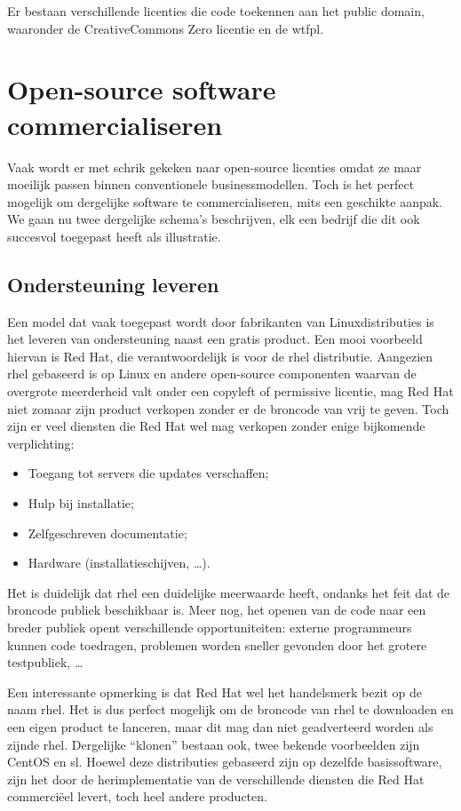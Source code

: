 Er bestaan verschillende licenties die code toekennen aan het public domain, waaronder de CreativeCommons Zero licentie en de \ac{wtfpl}.

\section{Open-source software commercialiseren}
\label{ontwerp:licenties:commercialiseren}

Vaak wordt er met schrik gekeken naar open-source licenties omdat ze maar moeilijk passen binnen conventionele businessmodellen. Toch is het perfect mogelijk om dergelijke software te commercialiseren, mits een geschikte aanpak. We gaan nu twee dergelijke schema's beschrijven, elk een bedrijf die dit ook succesvol toegepast heeft als illustratie.

\subsection{Ondersteuning leveren}
\label{ontwerp:licenties:commercialiseren:ondersteuning}

Een model dat vaak toegepast wordt door fabrikanten van Linuxdistributies is het leveren van ondersteuning naast een gratis product. Een mooi voorbeeld hiervan is Red Hat, die verantwoordelijk is voor de \ac{rhel} distributie. Aangezien \ac{rhel} gebaseerd is op Linux en andere open-source componenten waarvan de overgrote meerderheid valt onder een copyleft of permissive licentie, mag Red Hat niet zomaar zijn product verkopen zonder er de broncode van vrij te geven. Toch zijn er veel diensten die Red Hat wel mag verkopen zonder enige bijkomende verplichting:
\begin{itemize}
  \item Toegang tot servers die updates verschaffen;
  \item Hulp bij installatie;
  \item Zelfgeschreven documentatie;
  \item Hardware (installatieschijven, \ldots).
\end{itemize}

Het is duidelijk dat \ac{rhel} een duidelijke meerwaarde heeft, ondanks het feit dat de broncode publiek beschikbaar is. Meer nog, het openen van de code naar een breder publiek opent verschillende opportuniteiten: externe programmeurs kunnen code toedragen, problemen worden sneller gevonden door het grotere testpubliek, \ldots

Een interessante opmerking is dat Red Hat wel het handelsmerk bezit op de naam \acl{rhel}. Het is dus perfect mogelijk om de broncode van \ac{rhel} te downloaden en een eigen product te lanceren, maar dit mag dan niet geadverteerd worden als zijnde \ac{rhel}. Dergelijke ``klonen'' bestaan ook, twee bekende voorbeelden zijn CentOS en \ac{sl}. Hoewel deze distributies gebaseerd zijn op dezelfde basissoftware, zijn het door de herimplementatie van de verschillende diensten die Red Hat commerciëel levert, toch heel andere producten.

